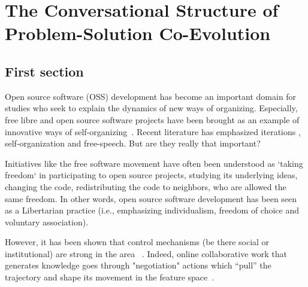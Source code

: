 \section{The Conversational Structure of Problem-Solution Co-Evolution}
\label{sec:conversational-structure}


\subsection{First section}

Open source software (OSS) development has become an important domain for studies who seek to explain the dynamics of new ways of organizing. Especially, free libre and open source software projects have been brought as an example of innovative ways of self-organizing~\cite{DBLP:journals/mansci/KroghH06,DBLP:journals/misq/HowisonC14}. Recent literature has emphasized iterations \cite{Berente2007}, self-organization and free-speech. But are they really that important?

Initiatives like the free software movement have often been understood as 
`taking freedom` in participating to open source projects, studying its underlying ideas, changing the code, redistributing the code to neighbors, who are allowed the same freedom. In other words, open source software development has been seen as a Libertarian practice (i.e., emphasizing individualism, freedom of choice and voluntary association). 



However, it has been shown that control mechanisms (be there social or institutional) are strong in the area ~\cite{Lindberg2016}. Indeed, online collaborative work that generates knowledge goes through "negotiation" actions which “pull” the trajectory and shape its movement in the feature space~\cite{Arazy2020}. 

